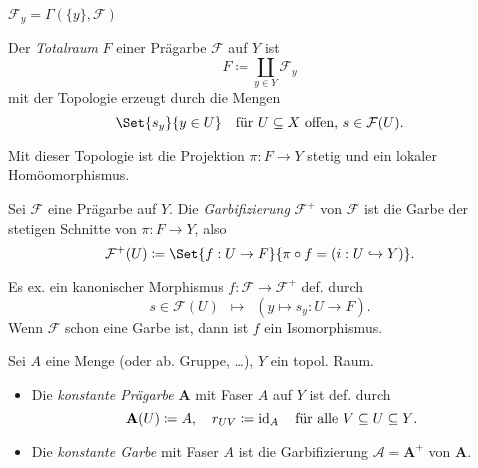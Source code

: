 \documentclass{cheat-sheet}
\newcommand{\Fais}{\mathcal{F}} %
\begin{document}
\begin{beob}
  $\Fais_y = \Gamma(\{y\}, \Fais)$
\end{beob}

\begin{defn}
  Der \emph{Totalraum} $F$ einer Prägarbe $\Fais$ auf $Y$ ist
  \[ F \coloneqq \coprod_{y \in Y} \Fais_y \]
  mit der Topologie erzeugt durch die Mengen
  \[
    \Set{s_y}{ y \in U } \quad
    \text{für $U \subseteq X$ offen, $s \in \Fais(U)$.}
  \]
\end{defn}

\begin{bem}
  Mit dieser Topologie ist die Projektion $\pi : F \to Y$ stetig und ein lokaler Homöomorphismus.
\end{bem}

\begin{defn}
  Sei $\Fais$ eine Prägarbe auf $Y$. Die \emph{Garbifizierung} $\Fais^+$ von $\Fais$ ist die Garbe der stetigen Schnitte von $\pi : F \to Y$, also
  \[ \Fais^+(U) \coloneqq \Set{f : U \to F}{\pi \circ f = (i : U \hookrightarrow Y)}. \]
\end{defn}

\begin{prop}
  Es ex. ein kanonischer Morphismus $f : \Fais \to \Fais^+$ def. durch
  \[ s \in \Fais(U) \enspace \mapsto \enspace (y \mapsto s_y : U \to F). \]
  Wenn $\Fais$ schon eine Garbe ist, dann ist $f$ ein Isomorphismus.
\end{prop}


\begin{defn}
  Sei $A$ eine Menge (oder ab. Gruppe, \ldots), $Y$ ein topol. Raum.
  \begin{itemize}
    \item Die \emph{konstante Prägarbe} $\mathbf{A}$ mit Faser $A$ auf $Y$ ist def. durch
    \[
      \mathbf{A}(U) \coloneqq A, \quad
      r_{UV} \coloneqq \operatorname{id}_A \quad
      \text{für alle $V \subseteq U \subseteq Y$.}
    \]
    \item Die \emph{konstante Garbe} mit Faser $A$ ist die Garbifizierung $\mathcal{A} = \mathbf{A}^+$ von $\mathbf{A}$.
  \end{itemize}
\end{defn}
\end{document}
